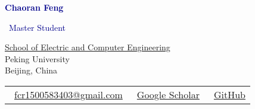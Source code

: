 \documentclass[11pt, a4paper]{article}
\newcommand{\sectioncolor}[1]{\textcolor{darkblue}{#1}}
\newcommand{\emailicon}{\faEnvelope}
\newcommand{\scholaricon}{\faGraduationCap}
\newcommand{\githubicon}{\faGithub}
\begin{document}
\begin{center}
    {\Huge\bfseries\sectioncolor{Chaoran Feng}}
    
    \vspace{8pt}
    
    {\large\sectioncolor{\faGraduationCap\ Master Student}}
    
    \vspace{10pt}
    
    {\href{https://www.ece.pku.edu.cn/}{School of Electric and Computer Engineering} \\
    Peking University \\
    Beijing, China}
    
    \vspace{12pt}
    
    \begin{tabular}{c c c}
        \emailicon\ \href{mailto:fcr1500583403@gmail.com}{fcr1500583403@gmail.com} &
        \scholaricon\ \href{https://scholar.google.com/citations?user=Thyo5v4AAAAJ&hl=en}{Google Scholar} &
        \githubicon\ \href{https://github.com/SuperFCR}{GitHub}
    \end{tabular}
\end{center}

\vspace{20pt}
\end{document}
